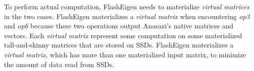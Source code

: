 


To perform actual computation, FlashEigen needs to materialize
\textit{virtual matrices} in the two cases. FlashEigen materializes
a \textit{virtual matrix} when encountering \textit{op3} and \textit{op6}
because these two operations output Anasazi's native matrices and vectors.
Each \textit{virtual matrix} represent some computation on some materialized
tall-and-skinny matrices that are stored on SSDs. FlashEigen materializes
a \textit{virtual matrix}, which has more than one materialized input matrix,
to minimize the amount of data read from SSDs.

